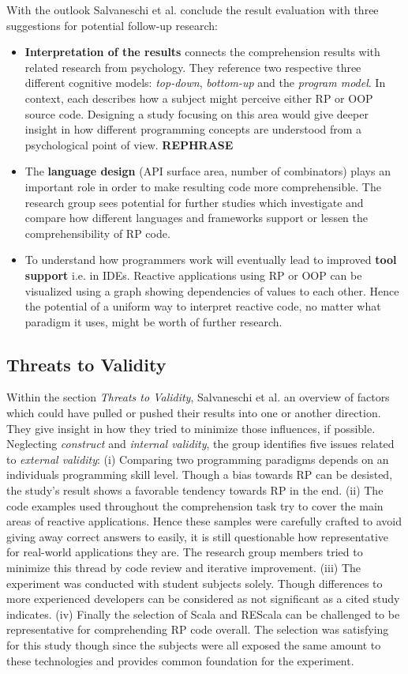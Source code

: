 \documentclass[12pt,a4paper]{article}
\begin{document}
With the outlook Salvaneschi et al. conclude the result evaluation with three suggestions for potential follow-up research:

\begin{itemize}
	\item \textbf{Interpretation of the results} connects the comprehension results with related research from psychology. They reference two respective three different cognitive models: \emph{top-down}, \emph{bottom-up} and the \emph{program model}. In context, each describes how a subject might perceive either RP or OOP source code. Designing a study focusing on this area would give deeper insight in how different programming concepts are understood from a psychological point of view. \textbf{REPHRASE}
	\item The \textbf{language design} (API surface area, number of combinators) plays an important role in order to make resulting code more comprehensible. The research group sees potential for further studies which investigate and compare how different languages and frameworks support or lessen the comprehensibility of RP code.
	\item To understand how programmers work will eventually lead to improved \textbf{tool support} i.e. in IDEs. Reactive applications using RP or OOP can be visualized using a graph showing dependencies of values to each other. Hence the potential of a uniform way to interpret reactive code, no matter what paradigm it uses, might be worth of further research.
\end{itemize}

\subsection{Threats to Validity}

Within the section \emph{Threats to Validity}, Salvaneschi et al. an overview of factors which could have pulled or pushed their results into one or another direction. They give insight in how they tried to minimize those influences, if possible. Neglecting \emph{construct} and \emph{internal validity}, the group identifies five issues related to \emph{external validity}: (i) Comparing two programming paradigms depends on an individuals programming skill level. Though a bias towards RP can be desisted, the study's result shows a favorable tendency towards RP in the end. (ii) The code examples used throughout the comprehension task try to cover the main areas of reactive applications. Hence these samples were carefully crafted to avoid giving away correct answers to easily, it is still questionable how representative for real-world applications they are. The research group members tried to minimize this thread by code review and iterative improvement. (iii) The experiment was conducted with student subjects solely. Though differences to more experienced developers can be considered as not significant as a cited study \cite{DiPenta} indicates. (iv) Finally the selection of Scala and REScala can be challenged to be representative for comprehending RP code overall. The selection was satisfying for this study though since the subjects were all exposed the same amount to these technologies and provides common foundation for the experiment.
\end{document}
